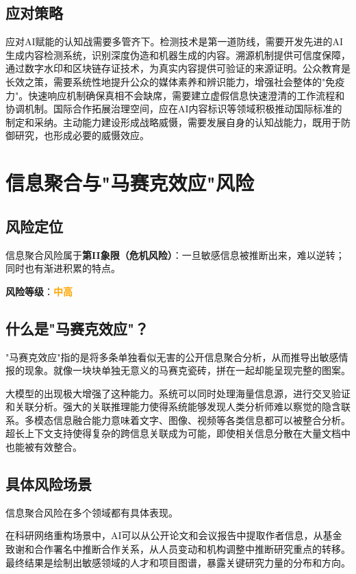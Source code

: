 \subsection{应对策略}

应对AI赋能的认知战需要多管齐下。检测技术是第一道防线，需要开发先进的AI生成内容检测系统，识别深度伪造和机器生成的内容。溯源机制提供可信度保障，通过数字水印和区块链存证技术，为真实内容提供可验证的来源证明。公众教育是长效之策，需要系统性地提升公众的媒体素养和辨识能力，增强社会整体的"免疫力"。快速响应机制确保真相不会缺席，需要建立虚假信息快速澄清的工作流程和协调机制。国际合作拓展治理空间，应在AI内容标识等领域积极推动国际标准的制定和采纳。主动能力建设形成战略威慑，需要发展自身的认知战能力，既用于防御研究，也形成必要的威慑效应。

\section{信息聚合与"马赛克效应"风险}

\subsection{风险定位}

信息聚合风险属于\textbf{第II象限（危机风险）}：一旦敏感信息被推断出来，难以逆转；同时也有渐进积累的特点。

\textbf{风险等级}：\textcolor{orange}{\textbf{中高}}

\subsection{什么是"马赛克效应"？}

"马赛克效应"指的是将多条单独看似无害的公开信息聚合分析，从而推导出敏感情报的现象。就像一块块单独无意义的马赛克瓷砖，拼在一起却能呈现完整的图案。

大模型的出现极大增强了这种能力。系统可以同时处理海量信息源，进行交叉验证和关联分析。强大的关联推理能力使得系统能够发现人类分析师难以察觉的隐含联系。多模态信息融合能力意味着文字、图像、视频等各类信息都可以被整合分析。超长上下文支持使得复杂的跨信息关联成为可能，即使相关信息分散在大量文档中也能被有效整合。

\subsection{具体风险场景}

信息聚合风险在多个领域都有具体表现。

在科研网络重构场景中，AI可以从公开论文和会议报告中提取作者信息，从基金致谢和合作署名中推断合作关系，从人员变动和机构调整中推断研究重点的转移。最终结果是绘制出敏感领域的人才和项目图谱，暴露关键研究力量的分布和方向。

